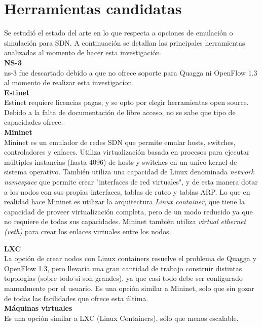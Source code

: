 \section{Herramientas candidatas}
Se estudió el estado del arte en lo que respecta a opciones de emulación o simulación para SDN. A continuación se detallan las principales herramientas analizadas al momento de hacer esta investigación.\\

\textbf{NS-3}\\
ns-3 fue descartado debido a que no ofrece soporte para Quagga ni OpenFlow 1.3 al momento de realizar esta investigacion.\\

\textbf{Estinet}\\
Estinet requiere licencias pagas, y se opto por elegir herramientas open source. Debido a la falta de documentación de libre acceso, no se sabe que tipo de capacidades ofrece.\\

\textbf{Mininet}\\
Mininet es un emulador de redes SDN que permite emular hosts, switches, controladores y enlaces. Utiliza virtualización basada en procesos para ejecutar múltiples instancias (hasta 4096) de hosts y switches en un unico kernel de sistema operativo. También utiliza una capacidad de Linux denominada \textit{network namespace} que permite crear "interfaces de red virtuales", y de esta manera dotar a los nodos con sus propias interfaces, tablas de ruteo y tablas ARP. Lo que en realidad hace Mininet es utilizar la arquitectura \textit{Linux container}, que tiene la capacidad de proveer virtualización completa, pero de un modo reducido ya que no requiere de todas sus capacidades. Mininet también utiliza \textit{virtual ethernet (veth)} para crear los enlaces virtuales entre los nodos.


\textbf{LXC}\\
La opción de crear nodos con Linux containers resuelve el problema de Quagga y OpenFlow 1.3, pero llevaría una gran cantidad de trabajo construir distintas topologias (sobre todo si son grandes), ya que casi todo debe ser configurado manualmente por el usuario. Es una opción similar a Mininet, solo que sin gozar de todas las facilidades que ofrece esta última.\\


\textbf{Máquinas virtuales}\\
Es una opción similar a LXC (Linux Containers), sólo que menos escalable.
\\

